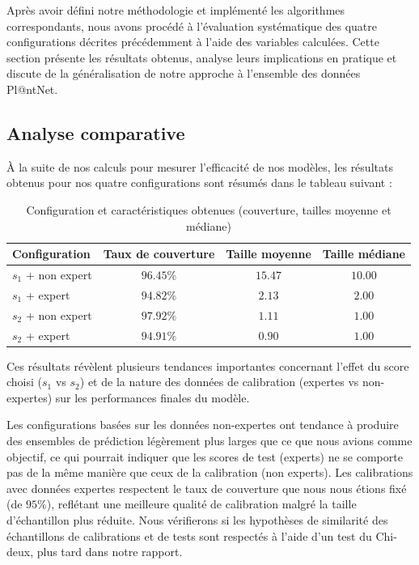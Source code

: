 \documentclass[a4paper,12pt]{article}
\begin{document}
Après avoir défini notre méthodologie et implémenté les algorithmes correspondants, nous avons procédé à l'évaluation systématique des quatre configurations décrites précédemment à l'aide des variables calculées. Cette section présente les résultats obtenus, analyse leurs implications en pratique et discute de la généralisation de notre approche à l'ensemble des données Pl@ntNet.


\subsection{Analyse comparative}

À la suite de nos calculs pour mesurer l'efficacité de nos modèles, les résultats obtenus pour nos quatre configurations sont résumés dans le tableau suivant :

\begin{table}[H]
\centering
\begin{tabular}{|l|c|c|c|}
    \hline
    \textbf{Configuration} & \textbf{Taux de couverture} & \textbf{Taille moyenne} & \textbf{Taille médiane} \\
    \hline
    $s_1$ + non expert & $96.45\%$ & $15.47$ & $10.00$ \\
    $s_1$ + expert & $94.82\%$ & $2.13$ & $2.00$ \\
    $s_2$ + non expert & $97.92\%$ & $1.11$ & $1.00$ \\
    $s_2$ + expert & $94.91\%$ & $0.90$ & $1.00$ \\
    \hline
    \end{tabular}
\caption{Configuration et caractéristiques obtenues (couverture, tailles moyenne et médiane)}
\label{tab3}
\end{table}
    
Ces résultats révèlent plusieurs tendances importantes concernant l'effet du score choisi ($s_1$ vs $s_2$) et de la nature des données de calibration (expertes vs non-expertes) sur les performances finales du modèle.

\vspace{0.2cm}

Les configurations basées sur les données non-expertes ont tendance à produire des ensembles de prédiction légèrement plus larges que ce que nous avions comme objectif, ce qui pourrait indiquer que les scores de test (experts) ne se comporte pas de la même manière que ceux de la calibration (non experts). Les calibrations avec données expertes respectent le taux de couverture que nous nous étions fixé (de $95\%$), reflétant une meilleure qualité de calibration malgré la taille d’échantillon plus réduite. Nous vérifierons si les hypothèses de similarité des échantillons de calibrations et de tests sont respectés à l'aide d'un test du Chi-deux, plus tard dans notre rapport.
\end{document}
